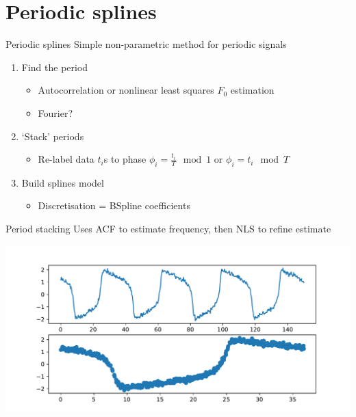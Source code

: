 \documentclass[presentation]{beamer}
\begin{document}
\section{Periodic splines}
\label{sec:org0b6d992}
\begin{frame}[label={sec:orgebfd0bd}]{Periodic splines}
Simple non-parametric method for periodic signals
\vfill
\begin{enumerate}[<+->]
\item Find the period
\begin{itemize}
\item Autocorrelation or nonlinear least squares \(F_0\) estimation
\item Fourier?
\end{itemize}
\item `Stack' periods
\begin{itemize}
\item Re-label data \(t_i\)s to phase \(\phi_i = \frac{t_i}{T} \mod 1\) or \(\phi_i = t_i \mod T\)
\end{itemize}
\item Build splines model
\begin{itemize}
\item Discretisation = BSpline coefficients
\end{itemize}
\end{enumerate}
\end{frame}

\begin{frame}[label={sec:orgd3ebd17}]{Period stacking}
Uses ACF to estimate frequency, then NLS to refine estimate

\begin{center}
\includegraphics[width=.9\linewidth]{./period_stack.pdf}
\end{center}
\end{frame}
\end{document}
